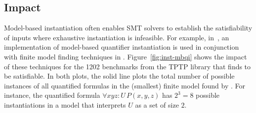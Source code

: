 \documentclass[oribibl]{llncs}
\begin{document}
\subsection{Impact}
Model-based instantiation often enables SMT solvers to
establish the satisfiability of inputs where exhaustive instantiation is infeasible.
For example,
in~\cite{}, an implementation of model-based quantifier instantiation is used
in conjunction with finite model finding techniques in \cvc.
Figure~\ref{fig:inst-mbqi} shows the impact of these techniques for the 1202
benchmarks from the TPTP library that \cvc finds to be satisfiable.
In both plots, the solid line plots the total number of possible instances of all quantified formulas
in the (smallest) finite model found by \cvc.
For instance, the quantified formula $\forall xyz : U\, P( x, y, z )$ has $2^3 = 8$ possible instantiations
in a model that interprets $U$ as a set of size $2$.
\end{document}
